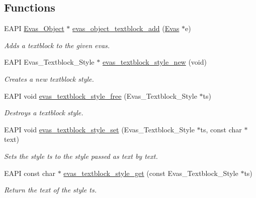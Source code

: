 \subsection*{Functions}
\begin{DoxyCompactItemize}
\item 
EAPI \hyperlink{group__Evas__Object__Group_ga9e19e6dd1f517a0ba437c0114d3e7c97}{Evas\_\-Object} $\ast$ \hyperlink{group__Evas__Object__Textblock_gac43a253bc767da912ee1818a8dfa5713}{evas\_\-object\_\-textblock\_\-add} (\hyperlink{group__Evas__Canvas_ga5ff87cc4ce6bc43e3b640a6d37f73043}{Evas} $\ast$e)
\begin{DoxyCompactList}\small\item\em Adds a textblock to the given evas. \item\end{DoxyCompactList}\item 
EAPI Evas\_\-Textblock\_\-Style $\ast$ \hyperlink{group__Evas__Object__Textblock_ga00cc8baec308c583ac801811dd381d4c}{evas\_\-textblock\_\-style\_\-new} (void)
\begin{DoxyCompactList}\small\item\em Creates a new textblock style. \item\end{DoxyCompactList}\item 
EAPI void \hyperlink{group__Evas__Object__Textblock_gaf527de9ea652e4435a0eaa6cda09585f}{evas\_\-textblock\_\-style\_\-free} (Evas\_\-Textblock\_\-Style $\ast$ts)
\begin{DoxyCompactList}\small\item\em Destroys a textblock style. \item\end{DoxyCompactList}\item 
EAPI void \hyperlink{group__Evas__Object__Textblock_gac239e4649b0893284ea962a2183c3f14}{evas\_\-textblock\_\-style\_\-set} (Evas\_\-Textblock\_\-Style $\ast$ts, const char $\ast$text)
\begin{DoxyCompactList}\small\item\em Sets the style ts to the style passed as text by text. \item\end{DoxyCompactList}\item 
EAPI const char $\ast$ \hyperlink{group__Evas__Object__Textblock_gae106e0cfb957f1916eb3833c1214394c}{evas\_\-textblock\_\-style\_\-get} (const Evas\_\-Textblock\_\-Style $\ast$ts)
\begin{DoxyCompactList}\small\item\em Return the text of the style ts. \item\end{DoxyCompactList}\item 

\end{DoxyCompactItemize}
